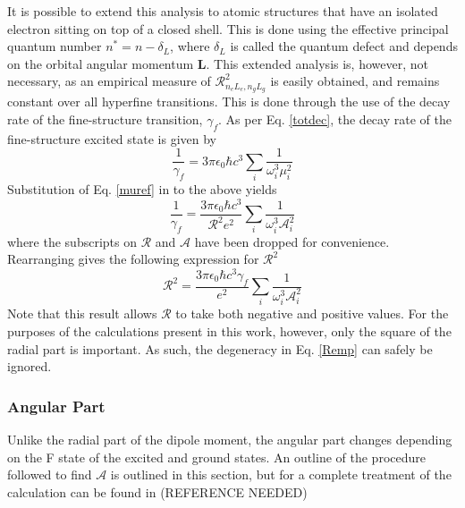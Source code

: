 \documentclass[12pt,a4paper,margin=1in]{report}
\begin{document}
It is possible to extend this analysis to atomic structures that have an isolated electron sitting on top of a closed shell. This is done using the effective principal quantum number $n^*= n - \delta_{L}$, where $\delta_{L}$ is called the quantum defect and depends on the orbital angular momentum \textbf{L}. This extended analysis is, however, not necessary, as an empirical measure of $ \mathcal{R}^2_{n_e L_e, n_g L_g}$ is easily obtained, and remains constant over all hyperfine transitions. This is done through the use of the decay rate of the fine-structure transition, $\gamma_f$. As per Eq. \ref{totdec}, the decay rate of the fine-structure excited state is given by
\begin{equation}
\frac{1}{\gamma_f} = 3 \pi \epsilon_0 \hbar c^3 \sum_i \frac{1}{\omega_i^3 \mu_i^2}
\end{equation}
Substitution of Eq. \ref{muref} in to the above yields
\begin{equation}
\frac{1}{\gamma_f} = \frac{3 \pi \epsilon_0 \hbar c^3}{\mathcal{R}^2e^2} \sum_i \frac{1}{\omega_i^3\mathcal{A}^2_i}
\end{equation}
where the subscripts on $\mathcal{R}$ and $\mathcal{A}$ have been dropped for convenience. Rearranging gives the following expression for $\mathcal{R}^2$
\begin{equation}
\mathcal{R}^2 = \frac{3 \pi \epsilon_0 \hbar c^3 \gamma_f}{e^2} \sum_i \frac{1}{\omega_i^3\mathcal{A}^2_i}
\label{Remp}
\end{equation}
Note that this result allows $\mathcal{R}$ to take both negative and positive values. For the purposes of the calculations present in this work, however, only the square of the radial part is important. As such, the degeneracy in Eq. \ref{Remp} can safely be ignored. 
\subsubsection*{Angular Part}
Unlike the radial part of the dipole moment, the angular part changes depending on the F state of the excited and ground states. An outline of the procedure followed to find $\mathcal{A}$ is outlined in this section, but for a complete treatment of the calculation can be found in (REFERENCE NEEDED) 
\end{document}
